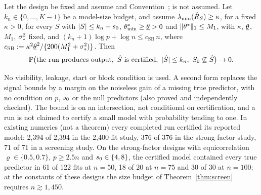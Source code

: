 

\begin{theorem}\label{thm:screen}
Let the design be fixed and assume  and Convention~;  is not assumed. Let $k_n\in\{0,\dots,K-1\}$ be
a model-size budget, and assume $\lambda_{\min}(\hat R_S)\ge\kappa$, for a fixed $\kappa>0$, for every $S$ with $\lvert S\rvert\le k_n+s_0$, $\theta^*_{\min}\ge\underline\theta>0$ and
$\lVert \theta^*\rVert_1\le M_1$, with $\kappa$, $\underline\theta$, $M_1$, $\sigma_*^2$ fixed, and $(k_n+1)\log p+\log n\le c_{\mathrm{SB}}\,n$, where
$c_{\mathrm{SB}}:=\kappa^2\underline\theta^2/\{200(M_1^2+\sigma_*^2)\}$. Then
\[
  \P\big(\text{the run produces output},\ \Shat\text{ is certified},\ \abs{\Shat}\le k_n,\ \Sz\not\subseteq\Shat\big)\to0 .
\]
\end{theorem}


No visibility, leakage, start or block condition is used. A second form replaces the signal bounds by a margin on the
noiseless gain of a missing true predictor, with no condition on $p$, $s_0$ or the null predictors (also proved and
independently checked). The bound is on an intersection, not conditional on certification, and a run is not claimed to certify a small model
with probability tending to one. In existing numerics (not a theorem) every completed run certified its reported model:
2,394 of 2,394 in the 2,400-fit study, 376 of 376 in the strong-factor study, 71 of 71 in a screening study. On the
strong-factor designs with equicorrelation $\varrho\in\{0.5,0.7\}$, $p\ge2.5n$ and $s_0\in\{4,8\}$, the certified model contained every true predictor in 61 of 122 fits at $n=50$, 18 of 20 at $n=75$
and 30 of 30 at $n=100$; at the constants of these designs the size budget of Theorem~\ref{thm:screen} requires
$n\gtrsim1{,}450$.


